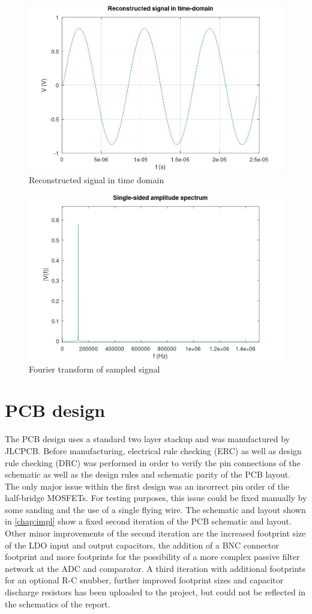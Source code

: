 \documentclass[
	english,
	ruledheaders=section, %
	class=report,%
	thesis={type=Project Seminar Report},%
	accentcolor=TUDa-1d, %
	custommargins=false,%
	marginpar=false,%
	parskip=half-,%
	fontsize=11pt,%
]{tudapub}
\begin{document}
\begin{figure}
    \centering
    \includegraphics[width=0.8\columnwidth]{images/adc_121_time.jpg}
    \caption{Reconstructed signal in time domain}
    \label{fig:adc_signal_time}
\end{figure}
\begin{figure}
    \centering
    \includegraphics[width=0.8\columnwidth]{images/adc_121_fft.jpg}
    \caption{Fourier transform of sampled signal}
    \label{fig:adc_signal_freq}
\end{figure}



\section{PCB design}
The PCB design uses a standard two layer stackup and was manufactured by JLCPCB. Before manufacturing, electrical rule checking (ERC) as well as design rule checking (DRC) was performed in order to verify the pin connections of the schematic as well as the design rules and schematic parity of the \gls{PCB} layout. The only major issue within the first design was an incorrect pin order of the half-bridge \glspl{MOSFET}. For testing purposes, this issue could be fixed manually by some sanding and the use of a single flying wire. The schematic and layout shown in \cref{chap:impl} show a fixed second iteration of the \gls{PCB} schematic and layout. Other minor improvements of the second iteration are the increased footprint size of the \gls{LDO} input and output capacitors, the addition of a BNC connector footprint and more footprints for the possibility of a more complex passive filter network at the \gls{ADC} and comparator. A third iteration with additional footprints for an optional R-C snubber, further improved footprint sizes and capacitor discharge resistors has been uploaded to the project, but could not be reflected in the schematics of the report.
\end{document}

